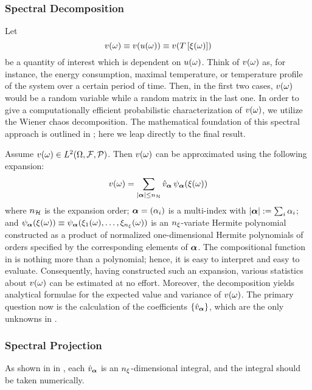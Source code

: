 \subsubsection{Spectral Decomposition}
Let
\[
  \w(\o) \equiv \w(\u(\o)) \equiv \w(\transformation{\z(\o)})
\]
be a quantity of interest which is dependent on $u(\omega)$.
Think of $v(\omega)$ as, for instance, the energy consumption, maximal temperature, or temperature profile of the system over a certain period of time.
Then, in the first two cases, $v(\omega)$ would be a random variable while a random matrix in the last one.
In order to give a computationally efficient probabilistic characterization of $v(\omega)$, we utilize the Wiener chaos decomposition.
The mathematical foundation of this spectral approach is outlined in ; here we leap directly to the final result.

Assume $v(\omega) \in L^{2}(\Omega, \mathcal{F}, \mathcal{P})$.
Then $v(\omega)$ can be approximated using the following expansion:
\begin{equation} \elab{wiener-chaos-decomposition}
  \w(\o) = \sum_{|\multiindex| \leq \ncorder} \coefficient{\w}_{\multiindex} \, \polynomial_{\multiindex}(\z(\o))
\end{equation}
where ${n_\mathcal{H}}$ is the expansion order; ${\boldsymbol \alpha} = (\alpha_i)$ is a multi-index with $|{\boldsymbol \alpha}| := \sum_i \alpha_i$; and $\psi_{{\boldsymbol \alpha}}(\xi(\omega)) \equiv \psi_{{\boldsymbol \alpha}}(\xi_1(\omega), \dots, \xi_{n_\xi}(\omega))$ is an ${n_\xi}$-variate Hermite polynomial constructed as a product of normalized one-dimensional Hermite polynomials of orders specified by the corresponding elements of ${\boldsymbol \alpha}$.
The compositional function in  is nothing more than a polynomial; hence, it is easy to interpret and easy to evaluate.
Consequently, having constructed such an expansion, various statistics about $v(\omega)$ can be estimated at no effort.
Moreover, the decomposition yields analytical formulae for the expected value and variance of $v(\omega)$.
The primary question now is the calculation of the coefficients $\{ \hat{v}_{{\boldsymbol \alpha}} \}$, which are the only unknowns in .

\subsubsection{Spectral Projection}
As shown in  in , each $\hat{v}_{{\boldsymbol \alpha}}$ is an ${n_\xi}$-dimensional integral, and the integral should be taken numerically.
